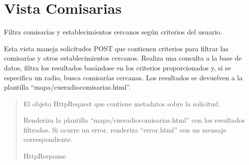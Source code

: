 \documentclass[letterpaper,10pt,spanish]{sphinxmanual}
\begin{document}
\section{Vista Comisarias}
\label{\detokenize{mapas:vista-comisarias}}

\begin{fulllineitems}

\pysigstartsignatures
{}
\pysigstopsignatures
\sphinxAtStartPar
Filtra comisarías y establecimientos cercanos según criterios del usuario.

\sphinxAtStartPar
Esta vista maneja solicitudes POST que contienen criterios para filtrar las
comisarías y otros establecimientos cercanos. Realiza una consulta a la base de datos,
filtra los resultados basándose en los criterios proporcionados y, si se especifica
un radio, busca comisarías cercanas. Los resultados se devuelven a la plantilla
“mapa/cueradiocomisarias.html”.
\begin{quote}\begin{description}
\sphinxAtStartPar
{} \textendash{} El objeto HttpRequest que contiene metadatos sobre la solicitud.

\sphinxAtStartPar
Renderiza la plantilla “mapa/cueradiocomisarias.html” con los resultados filtrados.
Si ocurre un error, renderiza “error.html” con un mensaje correspondiente.

\sphinxAtStartPar
HttpResponse

\end{description}\end{quote}

\end{fulllineitems}
\end{document}
